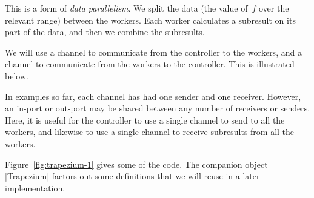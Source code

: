 This is a form of \emph{data parallelism}.  We split the data (the value
of~$f$ over the relevant range) between the workers.  Each worker calculates a
subresult on its part of the data, and then we combine the subresults. 



We will use a channel  to communicate from the
controller to the workers, and a channel 
to communicate from the workers to the controller.  This is illustrated below.
%
\begin{center}
\end{center}

In examples so far, each channel has had one sender and one receiver.
However, an in-port or out-port may be shared between any number of receivers
or senders.  Here, it is useful for the controller to use a single channel to
send to all the workers, and likewise to use a single channel to receive
subresults from all the workers.

Figure~\ref{fig:trapezium-1} gives some of the code.  The companion object
|Trapezium| factors out some definitions that we will reuse in a later
implementation. 


